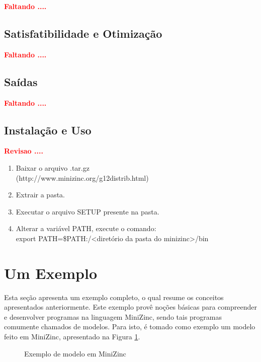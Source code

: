{\bf \textcolor{red}{Faltando ....}}
\subsection{Satisfatibilidade e Otimização}

{\bf \textcolor{red}{Faltando ....}}
\subsection{Saídas}

{\bf \textcolor{red}{Faltando ....}}


\subsection{Instalação e Uso}

{\bf \textcolor{red}{Revisao ....}}


\begin{enumerate}   

\item Baixar o arquivo .tar.gz \\\hspace*{0.3cm}(http://www.minizinc.org/g12distrib.html)
\item Extrair a pasta.
\item Executar o arquivo SETUP presente na pasta.
\item Alterar a variável PATH, execute o comando:
\\export PATH=\$PATH:/\textless diretório da pasta do 
minizinc\textgreater/bin
\end{enumerate}

\section{Um Exemplo}

Esta seção apresenta um exemplo completo, o qual  resume os conceitos apresentados anteriormente.
Este exemplo provê noções básicas para compreender e desenvolver programas na linguagem MiniZinc, sendo tais programas comumente chamados de modelos. Para isto, é tomado como exemplo um modelo feito em MiniZinc, apresentado na Figura \ref{code:exemple}.

\begin{figure}[!ht]
  \centering
  \caption{Exemplo de modelo em MiniZinc}
  \label{code:exemple}
  
\end{figure}

